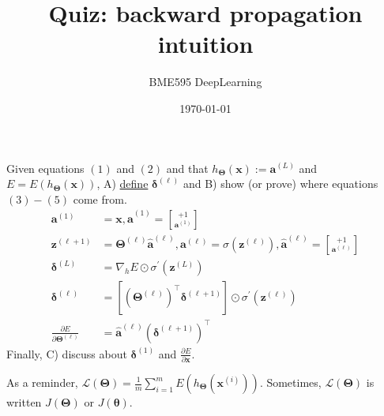 \documentclass{article}
\begin{document}
\title{Quiz: backward propagation intuition}
\author{BME595 DeepLearning}
\date{\today}
\maketitle

Given equations $(1)$ and $(2)$ and that $h_{\bm{\Theta}}(\bm{x}) := \bm{a}^{(L)}$ and $E = E(h_{\bm{\Theta}}(\bm{x}))$, A) \underline{define} $\bm{\delta}^{(\ell)}$ and B) show (or prove) where equations $(3)-(5)$ come from.
%
\begin{align}
  \bm{a}^{(1)}&=\bm{x}, \bm{\hat a}^{(1)}=\genfrac{[}{]}{0pt}{1}{+1}{\bm{a}^{(1)}} \\
  \bm{z}^{(\ell+1)}&=\bm{\Theta}^{(\ell)}\bm{\hat a}^{(\ell)}, \bm{a}^{(\ell)}=\sigma(\bm{z}^{(\ell)}), \bm{\hat a}^{(\ell)}=\genfrac{[}{]}{0pt}{1}{+1}{\bm{a}^{(\ell)}} \\
  \bm{\delta}^{(L)}&=\nabla_h E\odot\sigma^\prime(\bm{z}^{(L)}) \\
  \bm{\delta}^{(\ell)}&=[(\bm{\Theta}^{(\ell)})^\top\bm{\delta}^{(\ell+1)}]\odot\sigma^\prime(\bm{z}^{(\ell)}) \\
  \frac{\partial E}{\partial\bm{\Theta}^{(\ell)}}&=\bm{\hat a}^{(\ell)}(\bm{\delta}^{(\ell+1)})^\top
\end{align}
%
Finally, C) discuss about $\bm{\delta}^{(1)}$ and $\frac{\partial E}{\partial \bm{x}}$.

As a reminder, $\mathcal{L}(\bm{\Theta}) = \frac{1}{m} \sum_{i=1}^m E(h_{\bm{\Theta}}(\bm{x}^{(i)}))$. Sometimes, $\mathcal{L}(\bm{\Theta})$ is written $J(\bm{\Theta})$ or $J(\bm{\theta})$.
\end{document}
